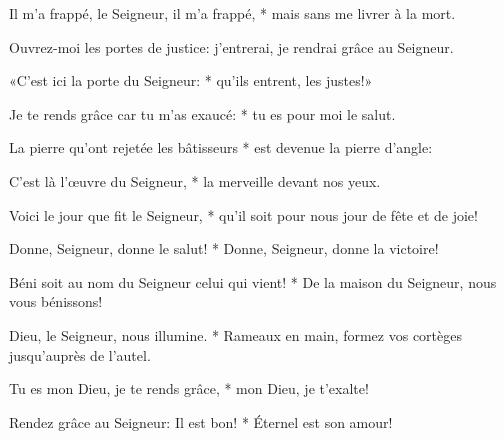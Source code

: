 \item Il m'a frappé, le Seigneur, il m'a frappé, *
mais sans me livrer à la mort.

\item Ouvrez-moi les portes de justice:
j'entrerai, je rendrai grâce au Seigneur.

\item «C'est ici la porte du Seigneur: *
qu'ils entrent, les justes!»

\item Je te rends grâce car tu m'as exaucé: *
tu es pour moi le salut.

\item La pierre qu'ont rejetée les bâtisseurs *
est devenue la pierre d'angle:

\item C'est là l'œuvre du Seigneur, *
la merveille devant nos yeux.

\item Voici le jour que fit le Seigneur, *
qu'il soit pour nous jour de fête et de joie!

\item Donne, Seigneur, donne le salut! *
Donne, Seigneur, donne la victoire!

\item Béni soit au nom du Seigneur
celui qui vient! *
De la maison du Seigneur,
nous vous bénissons!

\item Dieu, le Seigneur, nous illumine. *
Rameaux en main, formez vos cortèges
jusqu'auprès de l'autel.

\item Tu es mon Dieu, je te rends grâce, *
mon Dieu, je t'exalte!

\item Rendez grâce au Seigneur: Il est bon! *
Éternel est son amour!